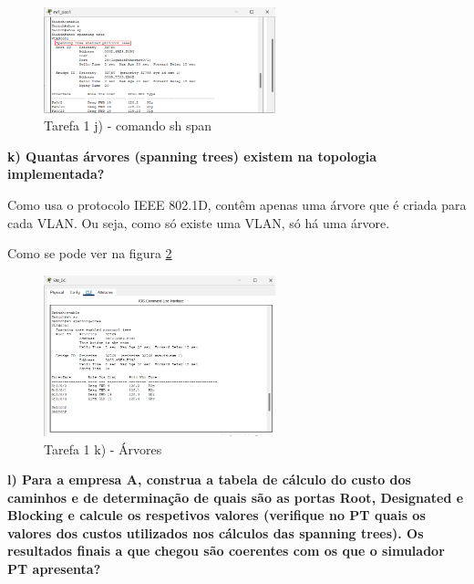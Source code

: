 \documentclass[11pt,english, openright, oneside]{book}
\begin{document}
\begin{figure}[H]
    \centering
    \includegraphics[width=0.6\textwidth]{imagens/Tarefa1/1.j.png}
    \caption{Tarefa 1 j) - comando sh span}
    \label{fig:1j}
\end{figure}

\vspace{0.8cm}

\textbf{k) Quantas árvores (spanning trees) existem na topologia implementada?}
\vspace{0.2cm}

Como usa o protocolo IEEE 802.1D, contêm apenas uma árvore que é criada para
cada VLAN. Ou seja, como só existe uma VLAN, só há uma árvore.

Como se pode ver na figura \ref{fig:1k}
\vspace{0.4cm}

\begin{figure}[H]
    \centering
    \includegraphics[width=0.6\textwidth]{imagens/Tarefa1/1.k.png}
    \caption{Tarefa 1 k) - Árvores}
    \label{fig:1k}
\end{figure}

\vspace{0.8cm}


\textbf{l) Para a empresa A, construa a tabela de cálculo do custo dos caminhos e de determinação de quais são as portas Root, Designated e Blocking e calcule os respetivos valores (verifique no PT quais os valores dos custos utilizados nos cálculos das spanning trees). Os resultados finais a que chegou são coerentes com os que o simulador PT apresenta?}
\vspace{0.2cm}
\end{document}
